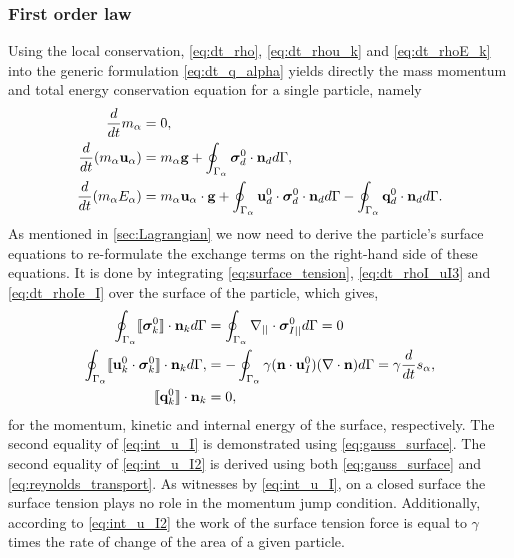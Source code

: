 

\subsubsection{First order law}

Using the local conservation, \ref{eq:dt_rho}, \ref{eq:dt_rhou_k} and \ref{eq:dt_rhoE_k} into the generic formulation \ref{eq:dt_q_alpha} yields directly the mass momentum and total energy conservation equation for a single particle, namely
\begin{align}
    \frac{d}{dt} m_\alpha
    &= 
    0,\\
    \frac{d}{dt} (m_\alpha \textbf{u}_\alpha)
    &= 
    m_\alpha\textbf{g}
    +  \oint_{\Gamma_{\alpha}} \bm{\sigma}_d^0 \cdot \textbf{n}_d d\Gamma,\\
    \frac{d}{dt} (m_\alpha E_\alpha)
    &= 
    m_\alpha \textbf{u}_\alpha \cdot \textbf{g}
    +\oint_{\Gamma_{\alpha}} \textbf{u}_d^0 \cdot \bm{\sigma}_d^0 \cdot  \textbf{n}_d d\Gamma 
    - \oint_{\Gamma_{\alpha}} \textbf{q}_d^0 \cdot \textbf{n}_d d\Gamma. 
\end{align}
As mentioned in \ref{sec:Lagrangian} we now need to derive the particle's surface equations to re-formulate the exchange terms on the right-hand side of these equations. 
It is done by integrating \ref{eq:surface_tension}, \ref{eq:dt_rhoI_uI3} and  \ref{eq:dt_rhoIe_I}  over the surface of the particle, which gives,  
\begin{align}
    \label{eq:int_u_I}
    \oint_{\Gamma_{\alpha}} \llbracket \bm{\sigma}_k^0 \rrbracket \cdot \textbf{n}_k  d\Gamma
    &=
    \oint_{\Gamma_{\alpha}} \mathbf{\nabla}_{||}\cdot\bm\sigma^0_{I||} d\Gamma = 0\\
    \label{eq:int_u_I2}
    \oint_{\Gamma_{\alpha}} \llbracket \textbf{u}_k^0 \cdot \bm{\sigma}_k^0 \rrbracket \cdot \textbf{n}_k d\Gamma,
    &=
    -\oint_{\Gamma_{\alpha}} \gamma(\textbf{n}\cdot \textbf{u}_{I}^0)(\mathbf{\nabla}\cdot \textbf{n}) d\Gamma
    = \gamma \frac{d}{dt} s_\alpha,\\
    \label{eq:int_q_I}
    \llbracket \textbf{q}_k^0 \rrbracket \cdot \textbf{n}_k
    &=
    0,
\end{align}
for the momentum, kinetic and internal energy of the surface, respectively. 
The second equality of \ref{eq:int_u_I} is demonstrated using \ref{eq:gauss_surface}. 
The second equality of \ref{eq:int_u_I2} is derived using both \ref{eq:gauss_surface} and \ref{eq:reynolds_transport}. 
As witnesses by \ref{eq:int_u_I}, on a closed surface the surface tension plays no role in the momentum jump condition.
Additionally, according to \ref{eq:int_u_I2} the work of the surface tension force is equal to $\gamma$ times the rate of change of the area of a given particle. 

